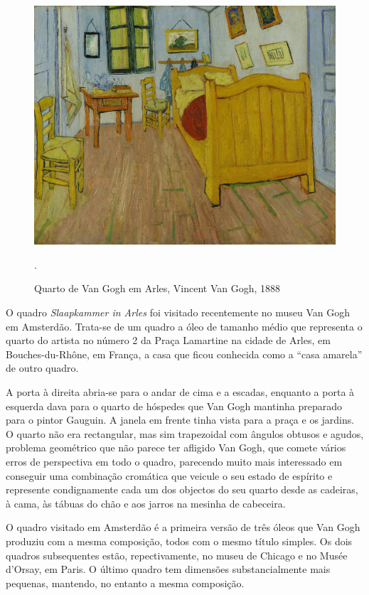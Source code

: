 \documentclass{article}
\begin{document}
\begin{figure}
\centering\includegraphics[height=0.3\textheight,keepaspectratio]
                          {../viagem-a-volta-do-meu-quarto/slaapkamer.jpg}
  \caption{Quarto de Van Gogh em Arles, Vincent Van Gogh, 1888}.
  \label{fig:5}
\end{figure}

O quadro \emph{Slaapkammer in Arles} foi visitado recentemente no
museu Van Gogh em Amsterdão. Trata-se de um quadro a óleo de tamanho
médio que representa o quarto do artista no número 2 da Praça
Lamartine na cidade de Arles, em Bouches-du-Rhône, em França, a casa
que ficou conhecida como a ``casa amarela'' de outro quadro.

A porta à direita abria-se para o andar de cima e a escadas, enquanto
a porta à esquerda dava para o quarto de hóspedes que Van Gogh
mantinha preparado para o pintor Gauguin. A janela em frente tinha
vista para a praça e os jardins. O quarto não era rectangular, mas sim
trapezoidal com ângulos obtusos e agudos, problema geométrico que não
parece ter afligido Van Gogh, que comete vários erros de perspectiva
em todo o quadro, parecendo muito mais interessado em conseguir uma
combinação cromática que veicule o seu estado de espírito e represente
condignamente cada um dos objectos do seu quarto desde as cadeiras, à
cama, às tábuas do chão e aos jarros na mesinha de cabeceira.

O quadro visitado em Amsterdão é a primeira versão de três óleos que
Van Gogh produziu com a mesma composição, todos com o mesmo título
simples. Os dois quadros subsequentes estão, repectivamente, no museu
de Chicago e no Musée d'Orsay, em Paris. O último quadro tem dimensões
substancialmente mais pequenas, mantendo, no entanto a mesma composição.
\end{document}
